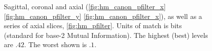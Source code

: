 \begin{figure}[H]
\caption{Sagittal, coronal and axial (\autoref{fig:hm_canon_pfilter_x} \autoref{fig:hm_canon_pfilter_y} 
         \autoref{fig:hm_canon_pfilter_x}), as well as a series of axial slices, \autoref{fig:hm_pfilter}. 
         Units of match is bits (standard for base-2 Mutual Information). The highest (best) levels are 
         $.42$. The worst shown is $.1$.}
\label{fig:hm_canon_pfilter_mi}
\end{figure}

